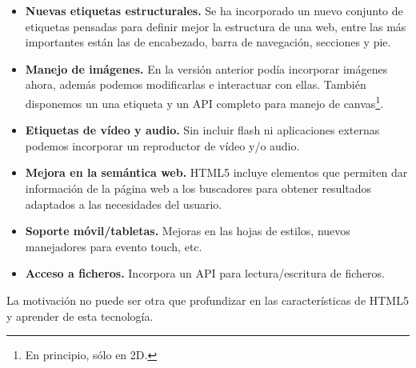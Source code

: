 \begin{itemize}
\item \textbf{Nuevas etiquetas estructurales.} Se ha incorporado un nuevo conjunto de etiquetas pensadas para definir mejor la estructura de una web, entre las más importantes están las de encabezado, barra de navegación, secciones y pie.

\item \textbf{Manejo de imágenes.} En la versión anterior podía incorporar imágenes ahora, además podemos modificarlas e interactuar con ellas. También disponemos un una etiqueta y un API completo para manejo de canvas\footnote{En principio, sólo en 2D.}.

\item \textbf{Etiquetas de vídeo y audio.} Sin incluir flash ni aplicaciones externas podemos incorporar un reproductor de vídeo y/o audio. 

\item \textbf{Mejora en la semántica web.} HTML5 incluye elementos que permiten dar información de la página web a los buscadores para obtener resultados adaptados a las necesidades del usuario.

\item \textbf{Soporte móvil/tabletas.} Mejoras en las hojas de estilos, nuevos manejadores para evento touch, etc.

\item \textbf{Acceso a ficheros.} Incorpora un API para lectura/escritura de ficheros.
  
\end{itemize}

La motivación no puede ser otra que profundizar en las características de HTML5 y aprender de esta tecnología. 
